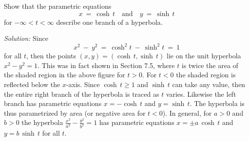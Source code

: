 \begin{exmp}\label{exmp:paramhyperbola}
\noindent Show that the parametric equations
\[
x ~=~ \cosh\,t \quad\text{and}\quad y ~=~ \sinh\,t
\]
for $-\infty < t < \infty$ describe one branch of a hyperbola.\vspace{1mm}
\par\noindent\emph{Solution:} Since
\[
x^2 ~-~ y^2 ~=~ \cosh^2 t ~-~ \sinh^2 t ~=~ 1
\]
for all $t$, then the points $(x,y) = (\cosh\,t,\sinh\,t)$ lie on the unit
hyperbola $x^2-y^2=1$. This was in fact shown in Section 7.5, where $t$ is twice
the area of the shaded region in the above figure for $t>0$. For $t<0$ the
shaded region is reflected below the $x$-axis. Since $\cosh\,t \ge 1$ and
$\sinh\,t$ can take any value, then the entire right branch of the hyperbola is
traced as $t$ varies. Likewise the left branch has parametric equations
$x=-\cosh\,t$ and $y=\sinh\,t$. The hyperbola is thus parametrized by area (or
negative area for $t <0$). In general, for $a>0$ and $b>0$ the hyperbola
$\frac{x^2}{a^2}-\frac{y^2}{b^2}=1$ has parametric equations
$x=\pm a\,\cosh\,t$ and $y=b\,\sinh\,t$ for all $t$.
\end{exmp}
\divider
\newpage
